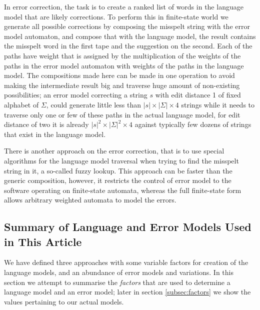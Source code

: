 \documentclass[a4paper,12pt]{article}
\begin{document}
In error correction, the task is to create a ranked list of words in the
language model that are likely corrections. To perform this in finite-state
world we generate all possible corrections by composing the misspelt string
with the error model automaton, and compose that with the language model, the
result contains the misspelt word in the first tape and the suggestion on the
second. Each of the paths have weight that is assigned by the multiplication of
the weights of the paths in the error model automaton with weights of the paths
in the language model. The compositions made here can be made in one
operation\cite{hfst/2012/cla} to avoid making the intermediate result big and
traverse huge amount of non-existing possibilities; an error model correcting a
string $s$ with edit distance 1 of fixed alphabet of $\Sigma$, could generate
little less than $|s| \times |\Sigma| \times 4$ strings while it needs to
traverse only one or few of these paths in the actual language model, for edit
distance of two it is already $|s|^2 \times |\Sigma|^2 \times 4$ against
typically few dozens of strings that exist in the language model.

There is another approach on the error correction, that is to use special
algorithms for the language model traversal when trying to find the misspelt
string in it, a so-called fuzzy lookup. This approach can be faster than
the generic composition, however, it restricts the control of error model to
the software operating on finite-state automata, whereas the full finite-state
form allows arbitrary weighted automata to model the errors.

\subsection{Summary of Language and Error Models Used in This Article}
\label{subsec:summary}

We have defined three approaches with some variable factors for creation of the
language models, and an abundance of error models and variations. In this
section we attempt to summarise the \emph{factors} that are used to determine a
language model and an error model; later in section \ref{subsec:factors} we
show the values pertaining to our actual models.
\end{document}

